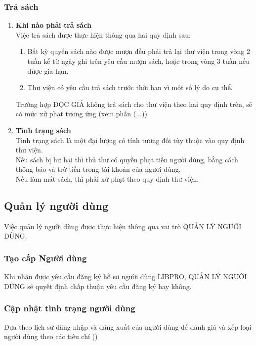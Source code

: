\documentclass[12pt,a4paper]{report}
\begin{document}
			\subsubsection{Trả sách}
				\begin{enumerate}
				\item \textbf{Khi nào phải trả sách}\\
					Việc trả sách được thực hiện thông qua hai quy định sau:
					\begin{enumerate}
						\item Bất kỳ quyển sách nào được mượn đều phải trả lại thư viện trong vòng 2 tuần kể từ ngày ghi trên yêu cầu mượn sách, hoặc trong vòng 3 tuần nếu được gia hạn.\\
						\item Thư viện có yêu cầu trả sách trước thời hạn vì một số lý do cụ thể.
					\end{enumerate}
					Trường hợp ĐỘC GIẢ không trả sách cho thư viện theo hai quy định trên, sẽ có mức xử phạt tương ứng (xem phần (...))\\
				\item \textbf{Tình trạng sách}\\
					Tình trạng sách là một đại lượng có tính tương đối tùy thuộc vào quy định thư viện.\\
					Nếu sách bị hư hại thì thủ thư có quyền phạt tiền người dùng, bằng cách thông báo và trừ tiền trong tài khoản của ngươi dùng.\\
					Nếu làm mất sách, thì phải xử phạt theo quy định thư viện.\\
				\end{enumerate}
		\subsection{Quản lý người dùng}
		Việc quản lý người dùng được thực hiện thông qua vai trò QUẢN LÝ NGƯỜI DÙNG.\\
			\subsubsection{Tạo cấp Người dùng}
			Khi nhận được yêu cầu đăng ký hồ sơ người dùng LIBPRO, QUẢN LÝ NGƯỜI DÙNG sẽ quyết định chấp thuận yêu cầu đăng ký hay không.\\

			\subsubsection{Cập nhật tình trạng người dùng}
			Dựa theo lịch sử đăng nhập và đăng xuất của người dùng để đánh giá và xếp loại người dùng theo các tiêu chí ()\\ %
\end{document}
